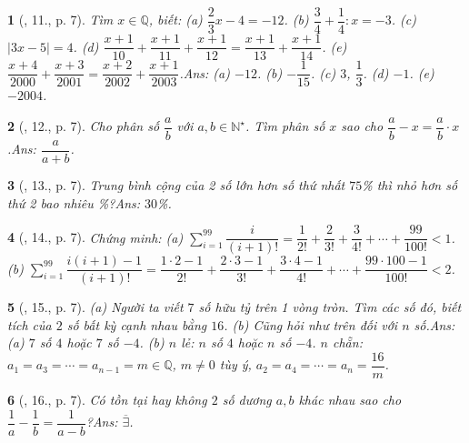 \documentclass{article}
\newtheorem{baitoan}{}
\begin{document}
\begin{baitoan}[\cite{Binh_Toan_7_tap_1}, 11., p. 7]
	Tìm $x\in\mathbb{Q}$, biết: (a) $\dfrac{2}{3}x - 4 = -12$. (b) $\dfrac{3}{4} + \dfrac{1}{4}:x = -3$. (c) $|3x - 5| = 4$. (d) $\dfrac{x + 1}{10} + \dfrac{x + 1}{11} + \dfrac{x + 1}{12} = \dfrac{x + 1}{13} + \dfrac{x + 1}{14}$. (e) $\dfrac{x + 4}{2000} + \dfrac{x + 3}{2001} = \dfrac{x + 2}{2002} + \dfrac{x + 1}{2003}$.\hfill{\sf Ans: (a) $-12$. (b) $-\dfrac{1}{15}$. (c) $3$, $\dfrac{1}{3}$. (d) $-1$. (e) $-2004$.}
\end{baitoan}

\begin{baitoan}[\cite{Binh_Toan_7_tap_1}, 12., p. 7]
	Cho phân số $\dfrac{a}{b}$ với $a,b\in\mathbb{N}^\star$. Tìm phân số $x$ sao cho $\dfrac{a}{b} - x = \dfrac{a}{b}\cdot x$.\hfill{\sf Ans: $\dfrac{a}{a + b}$.}
\end{baitoan}

\begin{baitoan}[\cite{Binh_Toan_7_tap_1}, 13., p. 7]
	Trung bình cộng của 2 số lớn hơn số thứ nhất $75$\% thì nhỏ hơn số thứ 2 bao nhiêu \%?\hfill{\sf Ans: $30$\%.}
\end{baitoan}

\begin{baitoan}[\cite{Binh_Toan_7_tap_1}, 14., p. 7]
	Chứng minh: (a) $\sum_{i=1}^{99} \dfrac{i}{(i+1)!} = \dfrac{1}{2!} + \dfrac{2}{3!} + \dfrac{3}{4!} + \cdots + \dfrac{99}{100!} < 1$. (b) $\sum_{i=1}^{99} \dfrac{i(i + 1) - 1}{(i+1)!} = \dfrac{1\cdot 2 - 1}{2!} + \dfrac{2\cdot 3 - 1}{3!} + \dfrac{3\cdot 4 - 1}{4!} + \cdots + \dfrac{99\cdot 100 - 1}{100!} < 2$.	
\end{baitoan}

\begin{baitoan}[\cite{Binh_Toan_7_tap_1}, 15., p. 7]
	(a) Người ta viết $7$ số hữu tỷ trên 1 vòng tròn. Tìm các số đó, biết tích của $2$ số bất kỳ cạnh nhau bằng $16$. (b) Cũng hỏi như trên đối với $n$ số.\hfill{\sf Ans: (a) $7$ số $4$ hoặc $7$ số $-4$. (b) $n$ lẻ: $n$ số $4$ hoặc $n$ số $-4$. $n$ chẵn: $a_1 = a_3 = \cdots = a_{n-1} = m\in\mathbb{Q}$, $m\ne 0$ tùy ý, $a_2 = a_4 = \cdots = a_n = \dfrac{16}{m}$.}
\end{baitoan}

\begin{baitoan}[\cite{Binh_Toan_7_tap_1}, 16., p. 7]
	Có tồn tại hay không $2$ số dương $a,b$ khác nhau sao cho $\dfrac{1}{a} - \dfrac{1}{b} = \dfrac{1}{a - b}$?\hfill{\sf Ans: $\overline{\exists}$.}
\end{baitoan}
\end{document}
